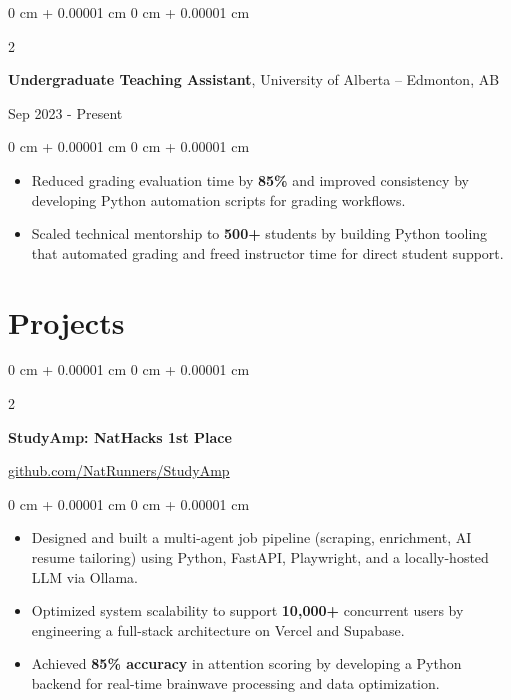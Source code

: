 \documentclass[10pt, letterpaper]{article}
\newenvironment{onecolentry}{
    \begin{adjustwidth}{
        0 cm + 0.00001 cm
    }{
        0 cm + 0.00001 cm
    }
}{
    \end{adjustwidth}
}
\newenvironment{twocolentry}[2][]{
    \onecolentry
    \def\secondColumn{#2}
    \setcolumnwidth{\fill, 6 cm}
    \begin{paracol}{2}
}{
    \switchcolumn \raggedleft \secondColumn
    \end{paracol}
    \endonecolentry
}
\begin{document}
    \vspace{0.10 cm}

    \begin{twocolentry}{Sep 2023 - Present}
        \textbf{Undergraduate Teaching Assistant}, University of Alberta -- Edmonton, AB
    \end{twocolentry}

   \vspace{0.10 cm}
    \begin{onecolentry}
        \begin{itemize}[leftmargin=2em, itemsep=1pt, parsep=0pt, topsep=0pt, partopsep=0pt]
            \item Reduced grading evaluation time by \textbf{85\%} and improved consistency by developing Python automation scripts for grading workflows.
            \item Scaled technical mentorship to \textbf{500+} students by building Python tooling that automated grading and freed instructor time for direct student support.
        \end{itemize}
    \end{onecolentry}

    \vspace{0.10 cm}
    \section{Projects}

    \begin{twocolentry}{\href{https://github.com/NatRunners/StudyAmp}{github.com/NatRunners/StudyAmp}}
        \textbf{StudyAmp: NatHacks 1st Place}
    \end{twocolentry}

    \vspace{0.10 cm}
    \begin{onecolentry}
        \begin{itemize}[leftmargin=2em, itemsep=1pt, parsep=0pt, topsep=0pt, partopsep=0pt]
            \item Designed and built a multi-agent job pipeline (scraping, enrichment, AI resume tailoring) using Python, FastAPI, Playwright, and a locally-hosted LLM via Ollama.
            \item Optimized system scalability to support \textbf{10,000+} concurrent users by engineering a full-stack architecture on Vercel and Supabase.
            \item Achieved \textbf{85\% accuracy} in attention scoring by developing a Python backend for real-time brainwave processing and data optimization.
        \end{itemize}
    \end{onecolentry}
\end{document}
